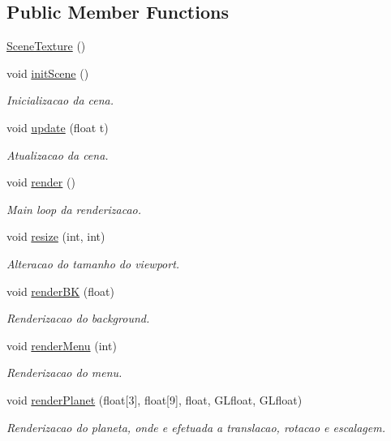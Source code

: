 \subsection*{Public Member Functions}
\begin{DoxyCompactItemize}
\item 
\mbox{\hyperlink{class_scene_texture_ae484bb2160a86922204010cfda100e85}{Scene\+Texture}} ()
\item 
void \mbox{\hyperlink{class_scene_texture_a22fb3251dd146c10643ca0af54b10bd5}{init\+Scene}} ()
\begin{DoxyCompactList}\small\item\em Inicializacao da cena. \end{DoxyCompactList}\item 
void \mbox{\hyperlink{class_scene_texture_a345ac4834ce9785ed91e24d25046a835}{update}} (float t)
\begin{DoxyCompactList}\small\item\em Atualizacao da cena. \end{DoxyCompactList}\item 
void \mbox{\hyperlink{class_scene_texture_ab988e3452c65e9b999a80764905159c4}{render}} ()
\begin{DoxyCompactList}\small\item\em Main loop da renderizacao. \end{DoxyCompactList}\item 
void \mbox{\hyperlink{class_scene_texture_a25d792c7e4f5eba8f9c04b28077c6804}{resize}} (int, int)
\begin{DoxyCompactList}\small\item\em Alteracao do tamanho do viewport. \end{DoxyCompactList}\item 
void \mbox{\hyperlink{class_scene_texture_a45e23149cc3ff37694ee17daffa29a01}{render\+BK}} (float)
\begin{DoxyCompactList}\small\item\em Renderizacao do background. \end{DoxyCompactList}\item 
void \mbox{\hyperlink{class_scene_texture_a195528c59a0cb7b6c1eeed33ca689208}{render\+Menu}} (int)
\begin{DoxyCompactList}\small\item\em Renderizacao do menu. \end{DoxyCompactList}\item 
void \mbox{\hyperlink{class_scene_texture_a3fdce2ddec5b4d71e25d99a487e81450}{render\+Planet}} (float\mbox{[}3\mbox{]}, float\mbox{[}9\mbox{]}, float, G\+Lfloat, G\+Lfloat)
\begin{DoxyCompactList}\small\item\em Renderizacao do planeta, onde e efetuada a translacao, rotacao e escalagem. \end{DoxyCompactList}\end{DoxyCompactItemize}
